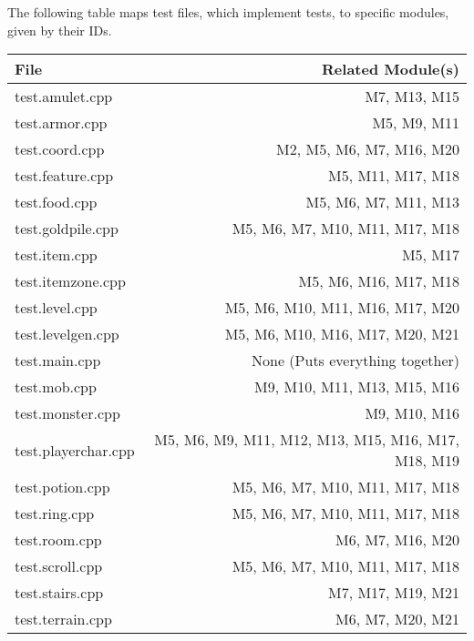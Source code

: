 \documentclass[12pt, titlepage]{article}
\begin{document}

	The following table maps test files, which implement tests, to specific modules, given by their IDs.\\

	\begin{table}[H]
		\caption{\bf Test-Module Trace}
		\label{TblMH}
		\bigskip
		\centering
		\begin{longtable}{lr}
			\hline
			File & Related Module(s)\\
			\hline
            test.amulet.cpp         & M7, M13, M15\\
            test.armor.cpp          & M5, M9, M11\\
            test.coord.cpp          & M2, M5, M6, M7, M16, M20\\
            test.feature.cpp        & M5, M11, M17, M18\\
            test.food.cpp           & M5, M6, M7, M11, M13\\
            test.goldpile.cpp       & M5, M6, M7, M10, M11, M17, M18\\
            test.item.cpp           & M5, M17\\
            test.itemzone.cpp       & M5, M6, M16, M17, M18\\
            test.level.cpp          & M5, M6, M10, M11, M16, M17, M20\\
            test.levelgen.cpp       & M5, M6, M10, M16, M17, M20, M21\\
            test.main.cpp           & None (Puts everything together)\\
            test.mob.cpp            & M9, M10, M11, M13, M15, M16\\
            test.monster.cpp        & M9, M10, M16\\
            test.playerchar.cpp     & M5, M6, M9, M11, M12, M13, M15, M16, M17, M18, M19\\
            test.potion.cpp         & M5, M6, M7, M10, M11, M17, M18\\
            test.ring.cpp           & M5, M6, M7, M10, M11, M17, M18\\
            test.room.cpp           & M6, M7, M16, M20\\
            test.scroll.cpp         & M5, M6, M7, M10, M11, M17, M18\\
            test.stairs.cpp         & M7, M17, M19, M21\\
            test.terrain.cpp        & M6, M7, M20, M21\\

\end{longtable}
\end{table}
\end{document}

